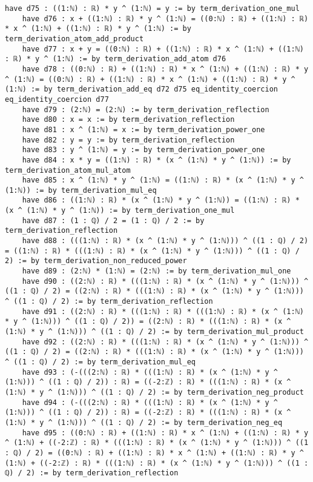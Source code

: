 \documentclass{article}
\begin{document}
\begin{tcolorbox}[colback=white!10, width=\linewidth]
\begin{lstlisting}[language=Lean4]
    have d75 : ((1:ℕ) : ℝ) * y ^ (1:ℕ) = y := by term_derivation_one_mul
    have d76 : x + ((1:ℕ) : ℝ) * y ^ (1:ℕ) = ((0:ℕ) : ℝ) + ((1:ℕ) : ℝ) * x ^ (1:ℕ) + ((1:ℕ) : ℝ) * y ^ (1:ℕ) := by term_derivation_atom_add_product
    have d77 : x + y = ((0:ℕ) : ℝ) + ((1:ℕ) : ℝ) * x ^ (1:ℕ) + ((1:ℕ) : ℝ) * y ^ (1:ℕ) := by term_derivation_add_atom d76
    have d78 : ((0:ℕ) : ℝ) + ((1:ℕ) : ℝ) * x ^ (1:ℕ) + ((1:ℕ) : ℝ) * y ^ (1:ℕ) = ((0:ℕ) : ℝ) + ((1:ℕ) : ℝ) * x ^ (1:ℕ) + ((1:ℕ) : ℝ) * y ^ (1:ℕ) := by term_derivation_add_eq d72 d75 eq_identity_coercion eq_identity_coercion d77
    have d79 : (2:ℕ) = (2:ℕ) := by term_derivation_reflection
    have d80 : x = x := by term_derivation_reflection
    have d81 : x ^ (1:ℕ) = x := by term_derivation_power_one
    have d82 : y = y := by term_derivation_reflection
    have d83 : y ^ (1:ℕ) = y := by term_derivation_power_one
    have d84 : x * y = ((1:ℕ) : ℝ) * (x ^ (1:ℕ) * y ^ (1:ℕ)) := by term_derivation_atom_mul_atom
    have d85 : x ^ (1:ℕ) * y ^ (1:ℕ) = ((1:ℕ) : ℝ) * (x ^ (1:ℕ) * y ^ (1:ℕ)) := by term_derivation_mul_eq
    have d86 : ((1:ℕ) : ℝ) * (x ^ (1:ℕ) * y ^ (1:ℕ)) = ((1:ℕ) : ℝ) * (x ^ (1:ℕ) * y ^ (1:ℕ)) := by term_derivation_one_mul
    have d87 : (1 : ℚ) / 2 = (1 : ℚ) / 2 := by term_derivation_reflection
    have d88 : (((1:ℕ) : ℝ) * (x ^ (1:ℕ) * y ^ (1:ℕ))) ^ ((1 : ℚ) / 2) = ((1:ℕ) : ℝ) * (((1:ℕ) : ℝ) * (x ^ (1:ℕ) * y ^ (1:ℕ))) ^ ((1 : ℚ) / 2) := by term_derivation_non_reduced_power
    have d89 : (2:ℕ) * (1:ℕ) = (2:ℕ) := by term_derivation_mul_one
    have d90 : ((2:ℕ) : ℝ) * (((1:ℕ) : ℝ) * (x ^ (1:ℕ) * y ^ (1:ℕ))) ^ ((1 : ℚ) / 2) = ((2:ℕ) : ℝ) * (((1:ℕ) : ℝ) * (x ^ (1:ℕ) * y ^ (1:ℕ))) ^ ((1 : ℚ) / 2) := by term_derivation_reflection
    have d91 : ((2:ℕ) : ℝ) * (((1:ℕ) : ℝ) * (((1:ℕ) : ℝ) * (x ^ (1:ℕ) * y ^ (1:ℕ))) ^ ((1 : ℚ) / 2)) = ((2:ℕ) : ℝ) * (((1:ℕ) : ℝ) * (x ^ (1:ℕ) * y ^ (1:ℕ))) ^ ((1 : ℚ) / 2) := by term_derivation_mul_product
    have d92 : ((2:ℕ) : ℝ) * (((1:ℕ) : ℝ) * (x ^ (1:ℕ) * y ^ (1:ℕ))) ^ ((1 : ℚ) / 2) = ((2:ℕ) : ℝ) * (((1:ℕ) : ℝ) * (x ^ (1:ℕ) * y ^ (1:ℕ))) ^ ((1 : ℚ) / 2) := by term_derivation_mul_eq
    have d93 : (-(((2:ℕ) : ℝ) * (((1:ℕ) : ℝ) * (x ^ (1:ℕ) * y ^ (1:ℕ))) ^ ((1 : ℚ) / 2)) : ℝ) = ((-2:ℤ) : ℝ) * (((1:ℕ) : ℝ) * (x ^ (1:ℕ) * y ^ (1:ℕ))) ^ ((1 : ℚ) / 2) := by term_derivation_neg_product
    have d94 : (-(((2:ℕ) : ℝ) * (((1:ℕ) : ℝ) * (x ^ (1:ℕ) * y ^ (1:ℕ))) ^ ((1 : ℚ) / 2)) : ℝ) = ((-2:ℤ) : ℝ) * (((1:ℕ) : ℝ) * (x ^ (1:ℕ) * y ^ (1:ℕ))) ^ ((1 : ℚ) / 2) := by term_derivation_neg_eq
    have d95 : ((0:ℕ) : ℝ) + ((1:ℕ) : ℝ) * x ^ (1:ℕ) + ((1:ℕ) : ℝ) * y ^ (1:ℕ) + ((-2:ℤ) : ℝ) * (((1:ℕ) : ℝ) * (x ^ (1:ℕ) * y ^ (1:ℕ))) ^ ((1 : ℚ) / 2) = ((0:ℕ) : ℝ) + ((1:ℕ) : ℝ) * x ^ (1:ℕ) + ((1:ℕ) : ℝ) * y ^ (1:ℕ) + ((-2:ℤ) : ℝ) * (((1:ℕ) : ℝ) * (x ^ (1:ℕ) * y ^ (1:ℕ))) ^ ((1 : ℚ) / 2) := by term_derivation_reflection

\end{lstlisting}
\end{tcolorbox}
\end{document}
